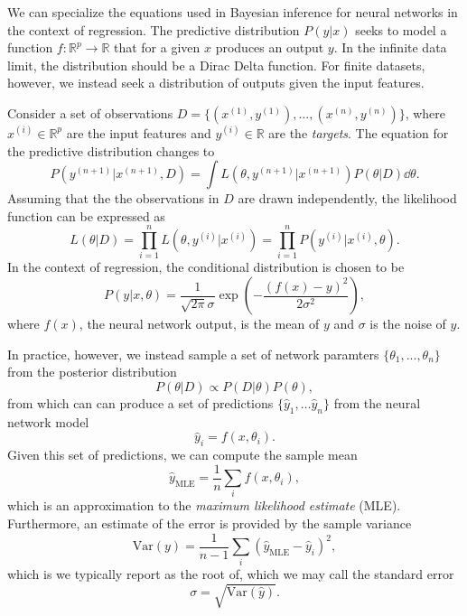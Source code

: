 We can specialize the equations used in Bayesian inference for neural networks in the context of regression.
The predictive distribution $P(y|x)$ seeks to model a function $f : \mathbb{R}^p \to \mathbb{R}$ that for a given $x$ produces an output $y$. In the infinite data limit, the distribution should be a Dirac Delta function. For finite datasets, however, we instead seek a distribution of outputs given the input features.

Consider a set of observations $D = \{(x^{(1)}, y^{(1)}), ..., (x^{(n)}, y^{(n)})\}$, where $x^{(i)} \in \mathbb{R}^p$ are the input features and $y^{(i)} \in \mathbb{R}$ are the \textit{targets}. The equation for the predictive distribution changes to
\begin{equation}
  P(y^{(n+1)}|x^{(n+1)}, D) = \int L(\theta, y^{(n+1)}|x^{(n+1)})P(\theta|D)\dd \theta.
\end{equation}
Assuming that the the observations in $D$ are drawn independently, the likelihood function can be expressed as
\begin{equation}
  L(\theta|D) = \prod_{i=1}^n L(\theta, y^{(i)}|x^{(i)}) = \prod_{i=1}^n P(y^{(i)}|x^{(i)}, \theta).
\end{equation}
In the context of regression, the conditional distribution is chosen to be
\begin{equation}
  P(y|x, \theta) = \frac{1}{\sqrt{2\pi}\sigma}\exp\left(-\frac{(f(x) - y)^2}{2\sigma^2}\right),
\end{equation}
where $f(x)$, the neural network output, is the mean of $y$ and $\sigma$ is the noise of $y$.

In practice, however, we instead sample a set of network paramters $\{\theta_1, ..., \theta_n\}$ from the posterior distribution
\begin{equation}
  P(\theta|D) \propto P(D|\theta)P(\theta),
\end{equation}
from which can can produce a set of predictions $\{\hat{y}_1,\ldots \hat{y}_n\}$ from the neural network model 
\begin{equation}
  \hat{y}_i = f(x, \theta_i).
\end{equation}
Given this set of predictions, we can compute the sample mean
\begin{equation}
  \hat{y}_\text{MLE} = \frac{1}{n}\sum_i f(x, \theta_i),
\end{equation}
which is an approximation to the \textit{maximum likelihood estimate} (MLE). Furthermore, an estimate of the error is provided by the sample variance
\begin{equation}
  \text{Var} (y) = \frac{1}{n-1}\sum_i (\hat{y}_\text{MLE} - \hat{y}_i)^2,
\end{equation}
which is we typically report as the root of, which we may call the standard error
\begin{equation}
  \sigma = \sqrt{\text{Var}(\hat{y})}.
\end{equation}


